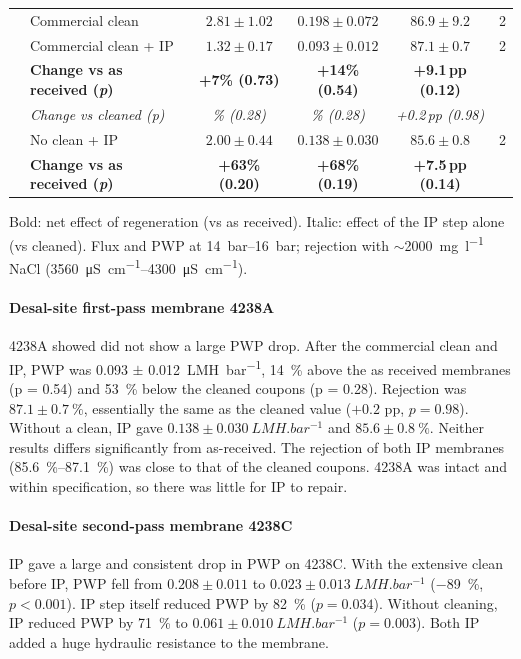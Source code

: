 \begin{table}[htbp]
\begin{tabular}{llcccc}
          & Commercial clean                & $2.81 \pm 1.02$ & $0.198 \pm 0.072$ & $86.9 \pm 9.2$ & 2 \\
          & Commercial clean + IP           & $1.32 \pm 0.17$ & $0.093 \pm 0.012$ & $87.1 \pm 0.7$ & 2 \\
          & \textbf{Change vs as received (\textit{p})} & \textbf{+7\% (0.73)} & \textbf{+14\% (0.54)} & \textbf{+9.1\,pp (0.12)} & \\
          & \textit{Change vs cleaned (\textit{p})}     & \textit{\textminus 53\% (0.28)} & \textit{\textminus 53\% (0.28)} & \textit{+0.2\,pp (0.98)} & \\
          & No clean + IP                   & $2.00 \pm 0.44$ & $0.138 \pm 0.030$ & $85.6 \pm 0.8$ & 2 \\
          & \textbf{Change vs as received (\textit{p})} & \textbf{+63\% (0.20)} & \textbf{+68\% (0.19)} & \textbf{+7.5\,pp (0.14)} & \\
    \bottomrule
  \end{tabular}
  \par\smallskip
  \footnotesize Bold: net effect of regeneration (vs as received). Italic: effect of the IP step alone (vs cleaned). Flux and PWP at \qtyrange{14}{16}{bar}; rejection with $\sim$\qty{2000}{\milli\gram\per\litre} NaCl (\qtyrange{3560}{4300}{\micro\siemens\per\centi\metre}).
\end{table}

\paragraph{Desal-site first-pass membrane 4238A}
4238A showed did not show a large PWP drop. After the commercial clean and IP, PWP was \qty{0.093}{} $\pm$ \qty{0.012}{LMH.bar^{-1}}, \qty{14}{\percent} above the as received membranes (p = 0.54) and \qty{53}{\percent} below the cleaned coupons (p = 0.28). Rejection was $87.1 \pm \qty{0.7}{\percent}$, essentially the same as the cleaned value ($+0.2$ pp, $p = 0.98$). Without a clean, IP gave $0.138 \pm \qty{0.030}{LMH.bar^{-1}}$ and $85.6 \pm \qty{0.8}{\percent}$. Neither results differs significantly from as-received. The rejection of both IP membranes (\qtyrange{85.6}{87.1}{\percent}) was close to that of the cleaned coupons. 4238A was intact and within specification, so there was little for IP to repair. 

\paragraph{Desal-site second-pass membrane 4238C}
IP gave a large and consistent drop in PWP on 4238C. With the extensive clean before IP, PWP fell from $0.208 \pm 0.011$ to $0.023 \pm \qty{0.013}{LMH.bar^{-1}}$ (\qty{-89}{\percent}, $p < 0.001$). IP step itself reduced PWP by \qty{82}{\percent} ($p = 0.034$). Without cleaning, IP reduced PWP by \qty{71}{\percent} to $0.061 \pm \qty{0.010}{LMH.bar^{-1}}$ ($p = 0.003$). Both IP added a huge hydraulic resistance to the membrane. 

